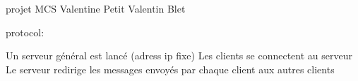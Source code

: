 projet M\+CS Valentine Petit Valentin Blet

protocol\+:

Un serveur général est lancé (adress ip fixe) Les clients se connectent au serveur Le serveur redirige les messages envoyés par chaque client aux autres clients 